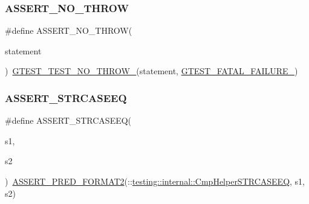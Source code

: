 \mbox{\label{_obj__test_2lib_2googletest-release-1_88_81_2googletest_2include_2gtest_2gtest_8h_a895c34d9b192cdc2ba46d2680623485d}} 
\subsubsection{\texorpdfstring{ASSERT\_NO\_THROW}{ASSERT\_NO\_THROW}}
{\footnotesize\ttfamily \#define A\+S\+S\+E\+R\+T\+\_\+\+N\+O\+\_\+\+T\+H\+R\+OW(\begin{DoxyParamCaption}\item[{}]{statement }\end{DoxyParamCaption})~\mbox{\hyperlink{_obj__test_2lib_2googletest-release-1_88_81_2googletest_2include_2gtest_2internal_2gtest-internal_8h_a9a109d026b5a904646437d7570e13581}{G\+T\+E\+S\+T\+\_\+\+T\+E\+S\+T\+\_\+\+N\+O\+\_\+\+T\+H\+R\+O\+W\+\_\+}}(statement, \mbox{\hyperlink{_obj__test_2lib_2googletest-release-1_88_81_2googletest_2include_2gtest_2internal_2gtest-internal_8h_a0f9a4c3ea82cc7bf4478eaffdc168358}{G\+T\+E\+S\+T\+\_\+\+F\+A\+T\+A\+L\+\_\+\+F\+A\+I\+L\+U\+R\+E\+\_\+}})}

\mbox{\label{_obj__test_2lib_2googletest-release-1_88_81_2googletest_2include_2gtest_2gtest_8h_a58847dd696200a3268361401dfcd0fa0}} 
\subsubsection{\texorpdfstring{ASSERT\_STRCASEEQ}{ASSERT\_STRCASEEQ}}
{\footnotesize\ttfamily \#define A\+S\+S\+E\+R\+T\+\_\+\+S\+T\+R\+C\+A\+S\+E\+EQ(\begin{DoxyParamCaption}\item[{}]{s1,  }\item[{}]{s2 }\end{DoxyParamCaption})~\mbox{\hyperlink{_obj__test_2lib_2googletest-release-1_88_81_2googletest_2include_2gtest_2gtest__pred__impl_8h_ac452685a1a98ea3d96eb956a062ee210}{A\+S\+S\+E\+R\+T\+\_\+\+P\+R\+E\+D\+\_\+\+F\+O\+R\+M\+A\+T2}}(\+::\mbox{\hyperlink{namespacetesting_1_1internal_a30dfeb01f1bc8087c7d05205d5fa75c1}{testing\+::internal\+::\+Cmp\+Helper\+S\+T\+R\+C\+A\+S\+E\+EQ}}, s1, s2)}

